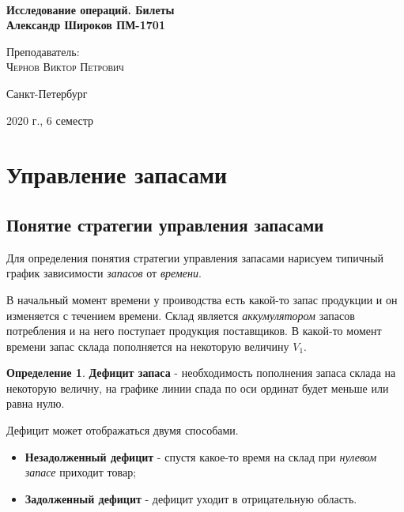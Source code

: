 \documentclass[aps,%
12pt,%
final,%
oneside,
onecolumn,%
musixtex, %
superscriptaddress,%
centertags]{article} %
\theoremstyle{plain}
\theoremstyle{definition}
\newtheorem{definition}{Определение}[subsection]
\theoremstyle{remark}
\begin{document}
\begin{titlepage} 
\begin{center}
\textbf{}\\[10.0cm]
\textbf{\LARGE Исследование операций. Билеты}\\[0.5cm]
\textbf{\Large Александр Широков ПМ-1701} \\[0.2cm]


\begin{center} \large
{Преподаватель:} \\[0.5cm]
\textsc {Чернов Виктор Петрович}\\
\end{center}

\vfill 



{\large {Санкт-Петербург}} \par
{\large {2020 г., 6 семестр}}
\end{center} 
\end{titlepage}

\begin{thebibliography}{3}
\end{thebibliography}
\tableofcontents
\newpage


\section{Управление запасами}

\subsection{Понятие стратегии управления запасами}

Для определения понятия стратегии управления запасами нарисуем типичный график зависимости \textit{запасов} от \textit{времени}. 

В начальный момент времени у проиводства есть какой-то запас продукции и он изменяется с течением времени. Склад является \textit{аккумулятором} запасов потребления и на него поступает продукция поставщиков. В какой-то момент времени запас склада пополняется на некоторую величину $V_1$.

\begin{definition}
	\textbf{Дефицит запаса} - необходимость пополнения запаса склада на некоторую величну, на графике линии спада по оси ординат будет меньше или равна нулю.
\end{definition}

Дефицит может отображаться двумя способами. 
\begin{itemize}
	\item \textbf{Незадолженный дефицит} - спустя какое-то время на склад при \textit{нулевом запасе} приходит товар;
	\item \textbf{Задолженный дефицит} - дефицит уходит в отрицательную область.
\end{itemize}
\end{document}
